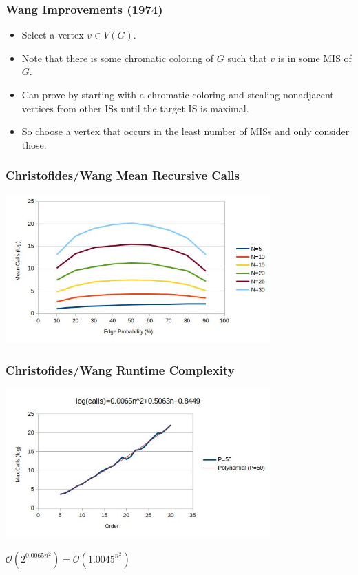 \documentclass{beamer}
\newcommand{\BO}{\mathcal{O}}
\begin{document}
\begin{frame}
  \frametitle{Wang Improvements (1974)}
  \begin{itemize}
  \item Select a vertex \(v\in V(G)\).
  \item Note that there is some chromatic coloring of \(G\) such that \(v\) is in some MIS of \(G\).
  \item Can prove by starting with a chromatic coloring and stealing nonadjacent vertices from other ISs until
    the target IS is maximal.
  \item So choose a vertex that occurs in the least number of MISs and only consider those.
  \end{itemize}
\end{frame}

\begin{frame}
  \frametitle{Christofides/Wang Mean Recursive Calls}
  \begin{center}
    \includegraphics[width=4in]{../final/wang_calls}
  \end{center}
\end{frame}

\begin{frame}
  \frametitle{Christofides/Wang Runtime Complexity}
  \begin{center}
    \includegraphics[width=4in]{../final/wang_runtime}

    \bigskip

    \(\BO(2^{0.0065n^2})=\BO(1.0045^{n^2})\)
  \end{center}
\end{frame}
\end{document}
